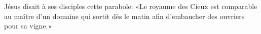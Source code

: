 \encetemps Jésus disait à ses disciples cette parabole:
	«Le royaume des Cieux est comparable
	au maître d’un domaine qui sortit dès le matin
	afin d’embaucher des ouvriers pour sa vigne.»
